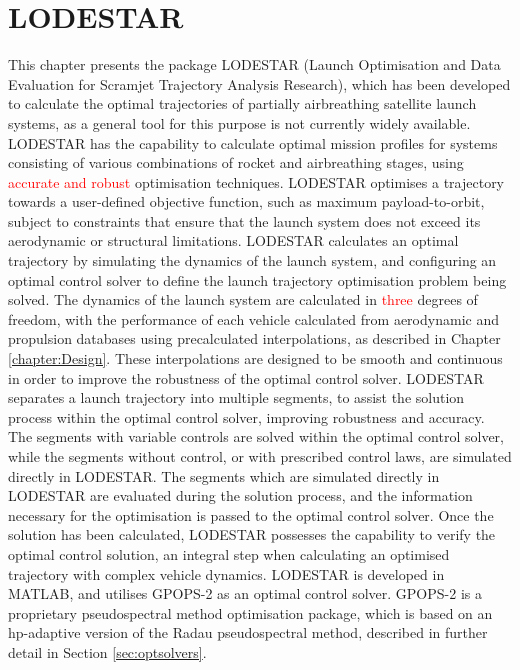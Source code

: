 
\cleardoublepage
\chapter{LODESTAR}\label{chapter:LODESTAR}


This chapter presents the package LODESTAR (Launch Optimisation and Data Evaluation for Scramjet Trajectory Analysis Research), which has been developed to calculate the optimal trajectories of partially airbreathing satellite launch systems, as a general tool for this purpose is not currently widely available. LODESTAR has the capability to calculate optimal mission profiles for systems consisting of various combinations of rocket and airbreathing stages, using \textcolor{red}{accurate and robust} optimisation techniques. 
LODESTAR optimises a trajectory towards a user-defined objective function, such as maximum payload-to-orbit, subject to constraints that ensure that the launch system does not exceed its aerodynamic or structural limitations.
LODESTAR calculates an optimal trajectory by simulating the dynamics of the launch system, and configuring an optimal control solver to define the launch trajectory optimisation problem being solved. 
The dynamics of the launch system are calculated in \textcolor{red}{three} degrees of freedom, with the performance of each vehicle calculated from aerodynamic and propulsion databases using precalculated interpolations, as described in Chapter \ref{chapter:Design}. These interpolations are designed to be smooth and continuous in order to improve the robustness of the optimal control solver.
LODESTAR separates a launch trajectory into multiple segments, to assist the solution process within the optimal control solver, improving robustness and accuracy. The segments with variable controls are solved within the optimal control solver, while the segments without control, or with prescribed control laws, are simulated directly in LODESTAR.
The segments which are simulated directly in LODESTAR are evaluated during the solution process, and the information necessary for the optimisation is passed to the optimal control solver.
Once the solution has been calculated, LODESTAR possesses the capability to verify the optimal control solution, an integral step when calculating an optimised trajectory with complex vehicle dynamics. 
LODESTAR is developed in MATLAB, and utilises GPOPS-2\cite{Patterson2015} as an optimal control solver. GPOPS-2 is a proprietary pseudospectral method optimisation package, which is based on an \textsf{hp}-adaptive version of the Radau pseudospectral method, described in further detail in Section \ref{sec:optsolvers}. 


